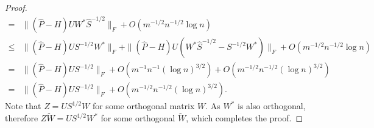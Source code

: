\begin{proof}
\begin{align*}
    = & \| (\hat{P} - H) U W^* \hat{S}^{-1/2} \|_F + O(m^{-1/2} n^{-1/2} \log n) \\
    \le & \| (\hat{P} - H) U S^{-1/2} W^* \|_F + \|(\hat{P} - H) U (W^* \hat{S}^{-1/2} - S^{-1/2} W^*) \|_F + O(m^{-1/2} n^{-1/2} \log n) \\
    = & \| (\hat{P} - H) U S^{-1/2}\|_F + O(m^{-1} n^{-1} (\log n)^{3/2}) + O(m^{-1/2} n^{-1/2} (\log n)^{3/2}) \\
    = & \| (\hat{P} - H) U S^{-1/2}\|_F + O(m^{-1/2} n^{-1/2} (\log n)^{3/2}).
\end{align*}
Note that $Z = U S^{1/2} W$ for some orthogonal matrix $W$. As $W^*$ is also orthogonal, therefore $Z \tilde{W} = U S^{1/2} W^*$ for some orthogonal $\tilde{W}$, which completes the proof.
\end{proof}

